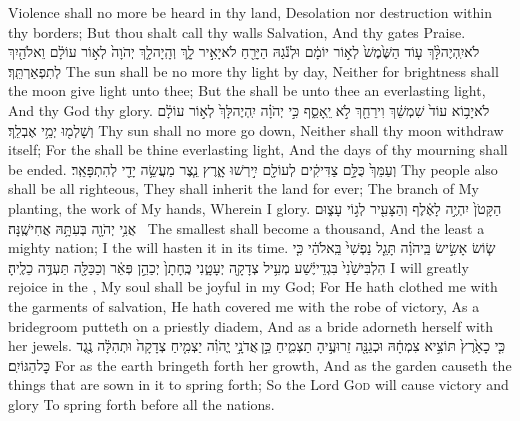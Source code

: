 {Violence shall no more be heard in thy land, Desolation nor destruction within thy borders; But thou shalt call thy walls Salvation, And thy gates Praise.}
{לֹא\maqqaf יִֽהְיֶה\maqqaf לָּ֨ךְ ע֤וֹד הַשֶּׁ֙מֶשׁ֙ לְא֣וֹר יוֹמָ֔ם וּלְנֹ֕גַהּ הַיָּרֵ֖חַ לֹא\maqqaf יָאִ֣יר לָ֑ךְ וְהָֽיָה\maqqaf לָ֤ךְ יְהֹוָה֙ לְא֣וֹר עוֹלָ֔ם וֵאלֹהַ֖יִךְ לְתִפְאַרְתֵּֽךְ׃}
{The sun shall be no more thy light by day, Neither for brightness shall the moon give light unto thee; But the \lord\space shall be unto thee an everlasting light, And thy God thy glory.}
{לֹא\maqqaf יָב֥וֹא עוֹד֙ שִׁמְשֵׁ֔ךְ וִירֵחֵ֖ךְ לֹ֣א יֵֽאָסֵ֑ף כִּ֣י יְהֹוָ֗ה יִֽהְיֶה\maqqaf לָּךְ֙ לְא֣וֹר עוֹלָ֔ם וְשָׁלְמ֖וּ יְמֵ֥י אֶבְלֵֽךְ׃}
{Thy sun shall no more go down, Neither shall thy moon withdraw itself; For the \lord\space shall be thine everlasting light, And the days of thy mourning shall be ended.}
{וְעַמֵּךְ֙ כֻּלָּ֣ם צַדִּיקִ֔ים לְעוֹלָ֖ם יִ֣ירְשׁוּ אָ֑רֶץ נֵ֧צֶר  מַעֲשֵׂ֥ה יָדַ֖י לְהִתְפָּאֵֽר׃}
{Thy people also shall be all righteous, They shall inherit the land for ever; The branch of My planting, the work of My hands, Wherein I glory.}
{הַקָּטֹן֙ יִהְיֶ֣ה לָאֶ֔לֶף וְהַצָּעִ֖יר לְג֣וֹי עָצ֑וּם אֲנִ֥י יְהֹוָ֖ה בְּעִתָּ֥הּ אֲחִישֶֽׁנָּה׃ \setuma }
{The smallest shall become a thousand, And the least a mighty nation; I the \lord\space will hasten it in its time.}
\label{haft_51}
\setcounter{chap}{61}
\setcounter{verse}{10}
{שׂ֧וֹשׂ אָשִׂ֣ישׂ בַּֽיהֹוָ֗ה תָּגֵ֤ל נַפְשִׁי֙ בֵּֽאלֹהַ֔י כִּ֤י הִלְבִּישַׁ֙נִי֙ בִּגְדֵי\maqqaf יֶ֔שַׁע מְעִ֥יל צְדָקָ֖ה יְעָטָ֑נִי כֶּֽחָתָן֙ יְכַהֵ֣ן פְּאֵ֔ר וְכַכַּלָּ֖ה תַּעְדֶּ֥ה כֵלֶֽיהָ׃}
{I will greatly rejoice in the \lord, My soul shall be joyful in my God; For He hath clothed me with the garments of salvation, He hath covered me with the robe of victory, As a bridegroom putteth on a priestly diadem, And as a bride adorneth herself with her jewels.}
{כִּ֤י כָאָ֙רֶץ֙ תּוֹצִ֣יא צִמְחָ֔הּ וּכְגַנָּ֖ה זֵרוּעֶ֣יהָ תַצְמִ֑יחַ כֵּ֣ן \legarmeh  אֲדֹנָ֣י יֱהֹוִ֗ה יַצְמִ֤יחַ צְדָקָה֙ וּתְהִלָּ֔ה נֶ֖גֶד כׇּל\maqqaf הַגּוֹיִֽם׃}
{For as the earth bringeth forth her growth, And as the garden causeth the things that are sown in it to spring forth; So the Lord \textsc{God} will cause victory and glory To spring forth before all the nations.}

